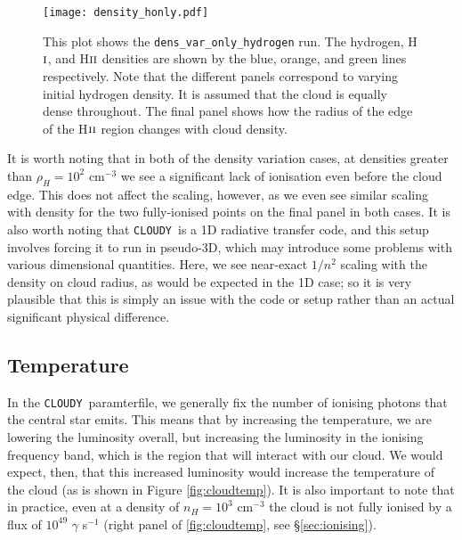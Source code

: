 \documentclass[a4paper]{article}
\newcommand{\cloudy}{{\tt CLOUDY}~}
\begin{document}
\begin{figure}[!h]
\centering
\texttt{[image: density\_honly.pdf]}
    \caption{This plot shows the {\tt dens\_var\_only\_hydrogen} run.
        The hydrogen, H$\textsc{i}$, and H$\textsc{ii}$ densities are shown by
        the blue, orange, and green lines respectively. Note that the different
        panels correspond to varying initial hydrogen density. It is assumed
        that the cloud is equally dense throughout. The final panel shows how
        the radius of the edge of the H$\textsc{ii}$ region changes with
        cloud density.}
    \label{fig:densityhonly}
\end{figure}
It is worth noting that in both of the density variation cases, at densities
greater than $\rho_H = 10^2$ cm$^{-3}$ we see a significant lack of ionisation
even before the cloud edge. This does not affect the scaling, however, as 
we even see similar scaling with density for the two fully-ionised points on
the final panel in both cases. It is also worth noting that \cloudy is a 1D
radiative transfer code, and this setup involves forcing it to run in pseudo-3D,
which may introduce some problems with various dimensional quantities. Here,
we see near-exact $1/n^2$ scaling with the density on cloud radius, as would
be expected in the 1D case; so it is very plausible that this is simply an
issue with the code or setup rather than an actual significant physical
difference.

\subsection{Temperature}\label{sec:temperature}

In the \cloudy paramterfile, we generally fix the number of ionising photons
that the central star emits. This means that by increasing the temperature,
we are lowering the luminosity overall, but increasing the luminosity in the
ionising frequency band, which is the region that will interact with our
cloud. We would expect, then, that this increased luminosity would increase
the temperature of the cloud (as is shown in Figure \ref{fig:cloudtemp}). It is
also important to note that in practice, even at a density of $n_H = 10^{3}$
cm$^{-3}$ the cloud is not fully ionised by a flux of $10^{49}$ $\gamma$
s$^{-1}$ (right panel of \ref{fig:cloudtemp}, see §\ref{sec:ionising}).
\end{document}
